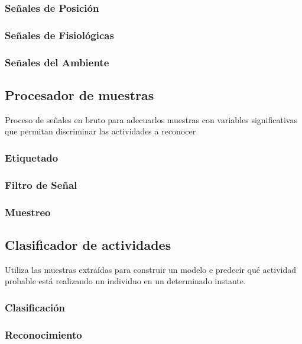 \subsubsection{Señales de Posición}

\subsubsection{Señales de Fisiológicas}

\subsubsection{Señales del Ambiente}

\subsection{Procesador de muestras}

\label{sec422:proceso-se=0000F1ales}Proceso de señales en bruto para
adecuarlos muestras con variables significativas que permitan discriminar
las actividades a reconocer

\subsubsection{Etiquetado}

\subsubsection{Filtro de Señal}

\subsubsection{Muestreo}

\subsection{Clasificador de actividades}

\label{sec423:clasificador}Utiliza las muestras extraídas para construir
un modelo e predecir qué actividad probable está realizando un individuo
en un determinado instante.

\subsubsection{Clasificación}

\subsubsection{Reconocimiento}

